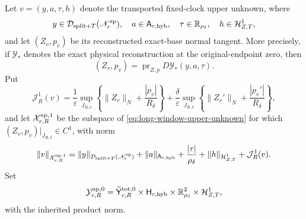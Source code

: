 \begin{theorem}
Let \(v=(y,a,\tau,h)\) denote the transported fixed-clock upper unknown,
where
\begin{equation}
 y\in\mathcal D_{\mathrm{split}+T}(\mathscr N_r^{\rm sp}),
 \quad a\in\mathsf A_{r,\mathrm{hyb}},
 \quad \tau\in\mathbb R_{\rho_\delta},
 \quad h\in\mathcal H_{Z,T}^1,                           \label{eq:long-window-upper-unknown}
\end{equation}
and let \((Z_v,p_v)\) be its reconstructed exact-base normal tangent.
More precisely, if \(\mathcal Y_*\) denotes the exact physical
reconstruction at the original-endpoint zero, then
\begin{equation}
 (Z_v,p_v)=\operatorname{pr}_{Z,p}
       D\mathcal Y_*(y,a,\tau).                         \label{eq:long-window-reconstructed-tangent}
\end{equation}
Put
\begin{equation}
 \mathcal J_{R}^1(v)
 =\frac1\varepsilon\sup_{J_{R,\delta}}
    \left\{\|Z_v\|_N+\frac{|p_v|}{R_\delta}\right\}
 +\frac\delta\varepsilon\sup_{J_{R,\delta}}
    \left\{\|Z_v'\|_N+\frac{|p_v'|}{R_\delta}\right\},   \label{eq:long-window-strong-normal-norm}
\end{equation}
and let \(\mathcal X_{r,R}^{\rm up,1}\) be the subspace of
\cref{eq:long-window-upper-unknown} for which
\((Z_v,p_v)|_{J_{R,\delta}}\in C^1\), with norm
\begin{equation}
 \|v\|_{\mathcal X_{r,R}^{\rm up,1}}
 =\|y\|_{\mathcal D_{\mathrm{split}+T}(\mathscr N_r^{\rm sp})}
  +\|a\|_{\mathsf A_{r,\mathrm{hyb}}}
  +\frac{|\tau|}{\rho_\delta}
  +\|h\|_{\mathcal H_{Z,T}^1}
  +\mathcal J_R^1(v).                           \label{eq:long-window-upper-domain-norm}
\end{equation}
Set
\begin{equation}
 \mathcal Y_{r,R}^{\rm up,0}
 =\widetilde{\mathsf Y}_{r,R}^{\mathrm{tot},0}
  \times\mathsf H_{r,\mathrm{hyb}}
  \times\mathbb R_{\rho_\delta}^2
  \times\mathcal H_{Z,T}^1,                   \label{eq:long-window-upper-range}
\end{equation}
with the inherited product norm.


\end{theorem}
